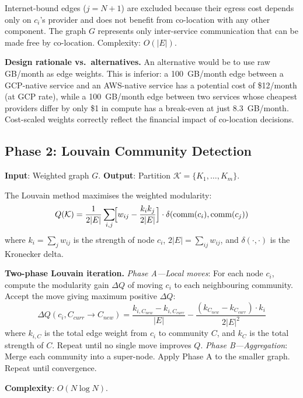 \documentclass[sigconf,10pt]{acmart}
\begin{document}
Internet-bound edges ($j = N+1$) are excluded because their egress cost depends only
on $c_i$'s provider and does not benefit from co-location with any other component.
The graph $G$ represents only inter-service communication that can be made free by
co-location.
Complexity: $O(|E|)$.

\textbf{Design rationale vs.\ alternatives.}
An alternative would be to use raw GB/month as edge weights.
This is inferior: a 100~GB/month edge between a GCP-native service and an
AWS-native service has a potential cost of \$12/month (at GCP rate), while
a 100~GB/month edge between two services whose cheapest providers differ by
only \$1 in compute has a break-even at just 8.3~GB/month.
Cost-scaled weights correctly reflect the financial impact of co-location decisions.

\subsection{Phase 2: Louvain Community Detection}

\textbf{Input}: Weighted graph $G$.
\textbf{Output}: Partition $\mathcal{K} = \{K_1, \ldots, K_m\}$.

The Louvain method maximises the weighted modularity:
\begin{equation}\label{eq:Q}
Q(\mathcal{K}) = \frac{1}{2|E|}\sum_{i,j}\!\Bigl[w_{ij} -
  \frac{k_i k_j}{2|E|}\Bigr] \cdot \delta(\text{comm}(c_i), \text{comm}(c_j))
\end{equation}
where $k_i = \sum_j w_{ij}$ is the strength of node $c_i$,
$2|E| = \sum_{ij} w_{ij}$, and $\delta(\cdot,\cdot)$ is the Kronecker delta.

\textbf{Two-phase Louvain iteration.}
\emph{Phase A---Local moves}: For each node $c_i$, compute the modularity gain
$\Delta Q$ of moving $c_i$ to each neighbouring community.
Accept the move giving maximum positive $\Delta Q$:
\begin{equation}\label{eq:deltaQ}
\Delta Q(c_i, C_{curr} \to C_{new}) =
\frac{k_{i,C_{new}} - k_{i,C_{curr}}}{|E|} -
\frac{(k_{C_{new}} - k_{C_{curr}}) \cdot k_i}{2|E|^2}
\end{equation}
where $k_{i,C}$ is the total edge weight from $c_i$ to community $C$,
and $k_C$ is the total strength of $C$.
Repeat until no single move improves $Q$.
\emph{Phase B---Aggregation}: Merge each community into a super-node.
Apply Phase A to the smaller graph.
Repeat until convergence.

\textbf{Complexity}: $O(N \log N)$.
\end{document}
